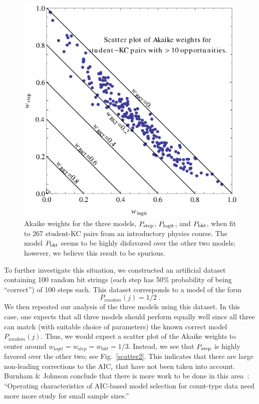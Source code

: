 \documentclass[11pt,letterpaper]{article}
\begin{document}
\begin{figure}
  \centering \includegraphics{scatter-weights.eps}
  \caption{Akaike weights for the three models, $P_{\rm step}$,
   $P_{\rm logit}$, and $P_{\rm bkt}$, when fit to 267
   student-KC pairs from an introductory physics course.
   The model $P_{\rm bkt}$ seems to be highly disfavored over
   the other two models; however, we believe this result
   to be spurious. \label{scatter1}}
\end{figure}

To further investigate this situation, we constructed an
artificial dataset containing 100 random bit strings (each
step has 50\% probability of being ``correct'') of 100 steps each.
This dataset corresponds to a model of the form
%
\begin{equation}
        P_{\mathrm random}(j)=1/2 \; .
\end{equation}
%
We then repeated our analysis of the three models using this
dataset.  In this
case, one expects that all three models should perform equally
well since all three can match (with suitable choice
of parameters) the known correct model $P_{\mathrm random}(j)$.
Thus, we would expect a scatter plot of the Akaike weights to 
center around 
$w_{\mathrm logit}=w_{\mathrm step}=w_{\mathrm bkt}=1/3$.
Instead, we see that $P_{\rm step}$ is highly favored over
the other two; see Fig.~\ref{scatter2}.  
This indicates that there are large non-leading
corrections to the AIC$_{\mathrm c}$ that have not been
taken into account.  Burnham \& Johnson conclude 
that there is more work to be done in this area~\cite[p.~380]{aicbook}: 
``Operating characteristics
of AIC-based model selection for count-type data need more 
more study for small sample sizes.''
\end{document}
